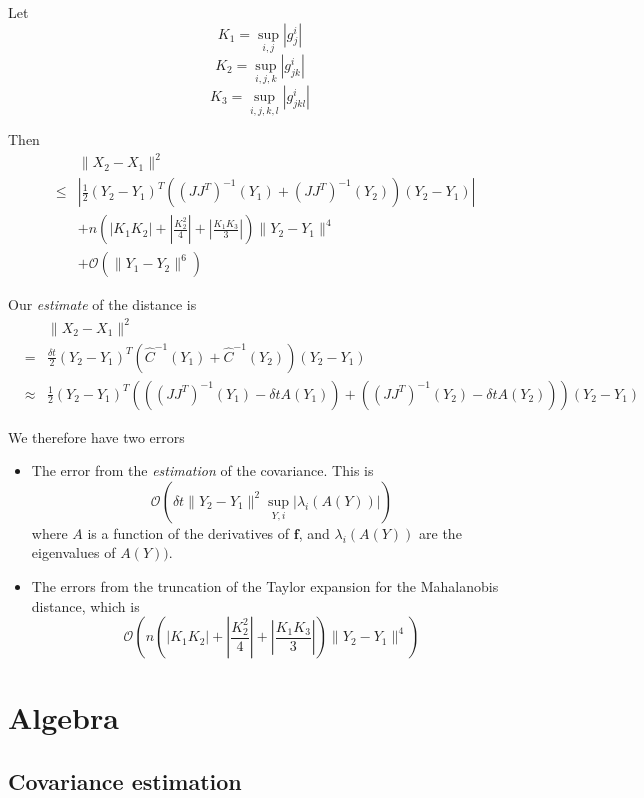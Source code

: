 \documentclass[12pt]{article}
\begin{document}
Let 
$$K_1 = \sup_{i,j} |g_j^i|$$
$$K_2 = \sup_{i,j,k} |g_{jk}^i|$$
$$K_3 = \sup_{i,j,k,l} |g_{jkl}^i|$$

Then
\begin{eqnarray}
&&\| X_2 - X_1 \|^2 \\
&\le&  \left| \frac{1}{2} (Y_2 - Y_1 )^T ((J J^T)^{-1} (Y_1) + (J J^T)^{-1}(Y_2)) (Y_2 - Y_1 ) \right| \\
&& + n \left( \left| K_1 K_2 \right| + \left| \frac{ K_2^2}{4} \right|  + \left| \frac{K_1 K_3}{3} \right|  \right) \| Y_2 - Y_1 \| ^4  \\
&& + \mathcal{O} (\|Y_1 - Y_2 \|^6 ) 
\end{eqnarray}

Our {\em estimate} of the distance is 
\begin{eqnarray}
&&\| X_2 - X_1 \|^2 \\
&=& \frac{\delta t}{2} (Y_2 - Y_1)^T (\hat{C}^{-1} (Y_1) + \hat{C}^{-1}(Y_2)) (Y_2 - Y_1)\\
&\approx & \frac{1}{2} (Y_2 - Y_1)^T \left( \left( (J J^T)^{-1}(Y_1)- \delta t A(Y_1) \right)  + \left((J J^T)^{-1}(Y_2)- \delta t A(Y_2) \right) \right) (Y_2 - Y_1)
\end{eqnarray}

We therefore have two errors
\begin{itemize}
\item The error from the {\em estimation} of the covariance.
%
This is
$$\mathcal{O} \left( \delta t \| Y_2 - Y_1 \|^2 \sup_{Y, i} |\lambda_i(A(Y))| \right)$$
%
where $A$ is a function of the derivatives of $\mathbf{f}$, and $\lambda_i(A(Y))$ are the eigenvalues of $A(Y))$.

\item The errors from the truncation of the Taylor expansion for the Mahalanobis distance, which is 
$$\mathcal{O} \left(  n \left( \left| K_1 K_2 \right| + \left| \frac{ K_2^2}{4} \right|  + \left| \frac{K_1 K_3}{3} \right|  \right) \| Y_2 - Y_1 \| ^4  \right)$$
\end{itemize}


\appendix

\section{Algebra}

\subsection{Covariance estimation}
\end{document}
